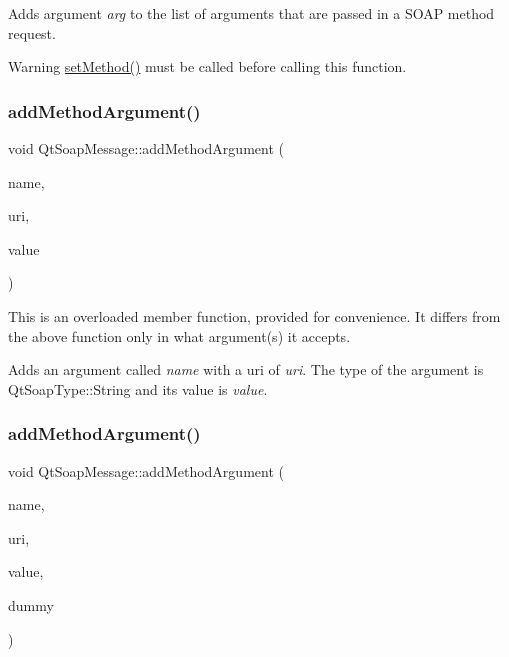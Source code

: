 Adds argument {\itshape arg} to the list of arguments that are passed in a S\+O\+AP method request.

\begin{DoxyWarning}{Warning}
\mbox{\hyperlink{class_qt_soap_message_a792f4e366d4bf4c3ca09ea6f034237b5}{set\+Method()}} must be called before calling this function. 
\end{DoxyWarning}
\mbox{\label{class_qt_soap_message_a9ad20b534929c505e23902f9534d518f}} 
\subsubsection{\texorpdfstring{add\+Method\+Argument()}{addMethodArgument()}\hspace{0.1cm}{\footnotesize\ttfamily [2/4]}}
{\footnotesize\ttfamily void Qt\+Soap\+Message\+::add\+Method\+Argument (\begin{DoxyParamCaption}\item[{const Q\+String \&}]{name,  }\item[{const Q\+String \&}]{uri,  }\item[{const Q\+String \&}]{value }\end{DoxyParamCaption})}

This is an overloaded member function, provided for convenience. It differs from the above function only in what argument(s) it accepts.

Adds an argument called {\itshape name} with a uri of {\itshape uri}. The type of the argument is Qt\+Soap\+Type\+::\+String and its value is {\itshape value}. \mbox{\label{class_qt_soap_message_a980ff800439c59294e6c2ab7529b109e}} 
\subsubsection{\texorpdfstring{add\+Method\+Argument()}{addMethodArgument()}\hspace{0.1cm}{\footnotesize\ttfamily [3/4]}}
{\footnotesize\ttfamily void Qt\+Soap\+Message\+::add\+Method\+Argument (\begin{DoxyParamCaption}\item[{const Q\+String \&}]{name,  }\item[{const Q\+String \&}]{uri,  }\item[{bool}]{value,  }\item[{int}]{dummy }\end{DoxyParamCaption})}

